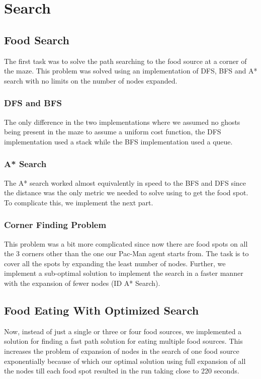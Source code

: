 \section{Search}
\subsection{Food Search}
The first task was to solve the path searching to the food source at a corner of the maze.
This problem was solved using an implementation of DFS, BFS and A* search with no limits on the number of nodes expanded.
\subsubsection{DFS and BFS}
The only difference in the two implementations where we assumed no ghosts being present in the maze to assume a uniform cost function, the DFS implementation used a stack while the BFS implementation used a queue.

\subsubsection{A* Search}
The A* search\cite{russell2003artificial} worked almost equivalently in speed to the BFS and DFS since the distance was the only metric we needed to solve using to get the food spot. To complicate this, we implement the next part.
\subsubsection{Corner Finding Problem}
This problem was a bit more complicated since now there are food spots on all the 3 corners other than the one our Pac-Man agent starts from. The task is to cover all the spots by expanding the least number of nodes.  
Further, we implement a sub-optimal solution to implement the search in a faster manner with the expansion of fewer nodes (ID A* Search).
\subsection{Food Eating With Optimized Search}
Now, instead of just a single or three or four food sources, we implemented a solution for finding a fast path solution for eating multiple food sources.
This increases the problem of expansion of nodes in the search of one food source exponentially because of which our optimal solution using full expansion of all the nodes till each food spot resulted in the run taking close to 220 seconds.

